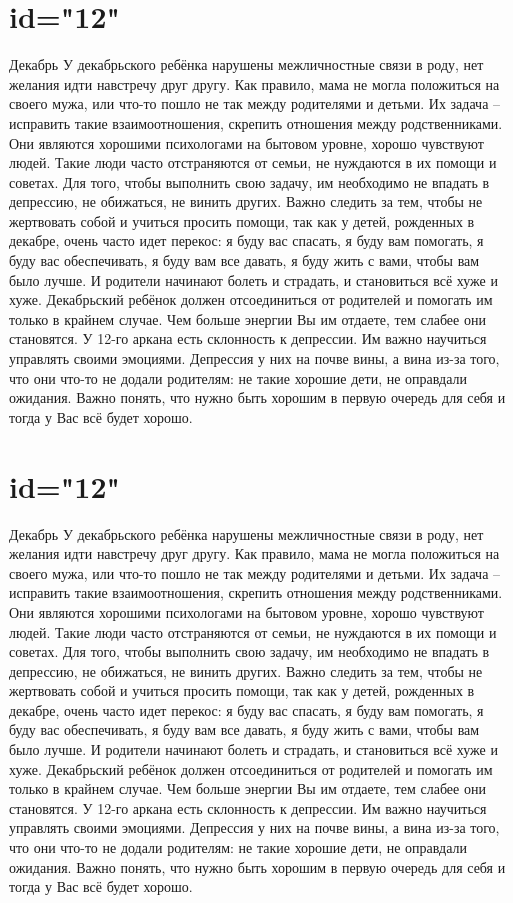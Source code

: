 \section{id="12"}{Декабрь}
У декабрьского ребёнка нарушены межличностные связи в роду, нет 
желания идти навстречу друг другу.
Как правило, мама не могла положиться на своего мужа, или что-то 
пошло не так между родителями и детьми.
Их задача – исправить такие взаимоотношения, скрепить отношения 
между родственниками. Они являются хорошими психологами на бытовом 
уровне, хорошо чувствуют людей. Такие люди часто отстраняются от 
семьи, не нуждаются в их помощи и советах. Для того, чтобы выполнить 
свою задачу, им необходимо не впадать в депрессию, не обижаться, 
не винить других. Важно следить за тем, чтобы не жертвовать собой 
и учиться просить помощи, так как у детей, рожденных в декабре, 
очень часто идет перекос: я буду вас спасать, я буду вам помогать, 
я буду вас обеспечивать, я буду вам все давать, я буду жить с вами, 
чтобы вам было лучше. И родители начинают болеть и страдать, и 
становиться всё хуже и хуже. Декабрьский ребёнок должен отсоединиться 
от родителей и помогать им только в крайнем случае. Чем больше энергии 
Вы им отдаете, тем слабее они становятся.
У 12-го аркана есть склонность к депрессии. Им важно научиться 
управлять своими эмоциями.
Депрессия у них на почве вины, а вина из-за того, что они что-то 
не додали родителям: не такие хорошие дети, не оправдали ожидания. 
Важно понять, что нужно быть хорошим в первую очередь для себя и 
тогда у Вас всё будет хорошо.
\endsection

\section{id="12"}{Декабрь}
У декабрьского ребёнка нарушены межличностные связи в роду, нет 
желания идти навстречу друг другу.
Как правило, мама не могла положиться на своего мужа, или что-то 
пошло не так между родителями и детьми.
Их задача – исправить такие взаимоотношения, скрепить отношения 
между родственниками. Они являются хорошими психологами на бытовом 
уровне, хорошо чувствуют людей. Такие люди часто отстраняются от 
семьи, не нуждаются в их помощи и советах. Для того, чтобы выполнить 
свою задачу, им необходимо не впадать в депрессию, не обижаться, 
не винить других. Важно следить за тем, чтобы не жертвовать собой 
и учиться просить помощи, так как у детей, рожденных в декабре, 
очень часто идет перекос: я буду вас спасать, я буду вам помогать, 
я буду вас обеспечивать, я буду вам все давать, я буду жить с вами, 
чтобы вам было лучше. И родители начинают болеть и страдать, и 
становиться всё хуже и хуже. Декабрьский ребёнок должен отсоединиться 
от родителей и помогать им только в крайнем случае. Чем больше энергии 
Вы им отдаете, тем слабее они становятся.
У 12-го аркана есть склонность к депрессии. Им важно научиться 
управлять своими эмоциями.
Депрессия у них на почве вины, а вина из-за того, что они что-то 
не додали родителям: не такие хорошие дети, не оправдали ожидания. 
Важно понять, что нужно быть хорошим в первую очередь для себя и 
тогда у Вас всё будет хорошо.
\endsection

